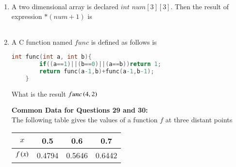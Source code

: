 \documentclass[journal]{IEEEtran}
\begin{document}
\begin{enumerate}
	\begin{enumerate}
\end{enumerate}
\item A two dimensional array is declared $int$ $num[3][3]$. Then the result of expression $*(num+1)$ is\\\\
	\begin{enumerate}
\end{enumerate}
\item A C function named $func$ is defined as follows is
\begin{lstlisting}[language=C]
    int func(int a, int b){
        if((a==1)||(b==0)||(a==b))return 1;
        return func(a-1,b)+func(a-1,b-1);
    }
\end{lstlisting}
	What is the result $func\left(4,2\right)$
	\begin{enumerate}
\end{enumerate}
\textbf{Common Data for Questions 29 and 30:}\\
The following table gives the values of a function $f$ at three distant points 
\begin{table}[h!]
\centering
\begin{tabular}{|c|c|c|c|}
\hline
$x$ & 0.5 & 0.6 & 0.7 \\ \hline
	$f\left(x\right)$ & 0.4794 & 0.5646 & 0.6442 \\ \hline
\end{tabular}
\end{table}


\end{enumerate}
\end{document}
